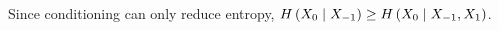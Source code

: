 \documentclass[ClusteringConnectionsMAIN.tex]{subfiles}
\begin{document}
	

  Since conditioning can only reduce entropy, $H \left( X_0 \mid X_{-1}  \right) \geq H \left( X_0 \mid X_{-1}, X_1  \right)$.
\end{document}
